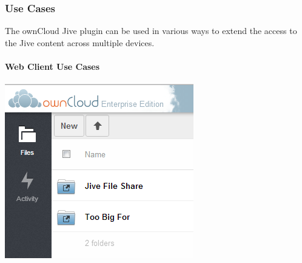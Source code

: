 \documentclass[letterpaper,10pt,english]{sphinxmanual}
\begin{document}
\subsubsection{Use Cases}
\label{enterprise_external_storage/jive_configuration:use-cases}
The ownCloud Jive plugin can be used in various ways to extend the access to the Jive content across multiple devices.


\paragraph{Web Client Use Cases}
\label{enterprise_external_storage/jive_configuration:web-client-use-cases}
\includegraphics[width=3.2398in,height=2.9898in]{jive_2.png}
\end{document}
